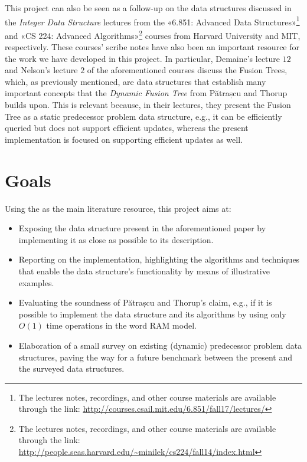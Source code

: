 This project can also be seen as a follow-up on the data structures discussed in the \textit{Integer Data Structure} lectures from the «6.851: Advanced Data Structures»\footnote{The lectures notes, recordings, and other course materials are available through the link: \url{http://courses.csail.mit.edu/6.851/fall17/lectures/}} and «CS 224: Advanced Algorithms»\footnote{The lectures notes, recordings, and other course materials are available through the link: \url{http://people.seas.harvard.edu/~minilek/cs224/fall14/index.html}} courses from Harvard University and MIT, respectively.
These courses' scribe notes have also been an important resource for the work we have developed in this project.
In particular, Demaine's lecture $12$ \cite{erikdemainelec12} and Nelson's lecture $2$ \cite{nelsonjelanilec2} of the aforementioned courses discuss the Fusion Trees, which, as previously mentioned, are data structures that establish many important concepts that the \textit{Dynamic Fusion Tree} from Pătrașcu and Thorup builds upon. 
This is relevant because, in their lectures, they present the Fusion Tree as a static predecessor problem data structure, e.g., it can be efficiently queried but does not support efficient updates, whereas the present implementation is focused on supporting efficient updates as well.

\section{Goals}

Using the \cite{patrascu2014dynamic} as the main literature resource, this project aims at:
\begin{itemize}
    \item
    Exposing the data structure present in the aforementioned paper by implementing it as close as possible to its description.
    
    \item
    Reporting on the implementation, highlighting the algorithms and techniques that enable the data structure's functionality by means of illustrative examples.
    
    \item
    Evaluating the soundness of Pătrașcu and Thorup's claim, e.g., if it is possible to implement the data structure and its algorithms by using only $O(1)$ time operations in the word RAM model.
    
    \item
    Elaboration of a small survey on existing (dynamic) predecessor problem data structures, paving the way for a future benchmark between the present and the surveyed data structures.
\end{itemize}

